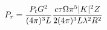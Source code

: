 \documentclass[preview]{standalone}
\begin{document}
\begin{align*}
\special{dvisvgm:raw <g id='unique000'>}P_r = \frac{P_t G^2}{(4 \pi)^3 L} \frac{c \tau \Omega \pi^5 |K|^2 Z}{2 (4 \pi)^3 L \lambda^2 R^2}\special{dvisvgm:raw </g>}
\end{align*}
\end{document}
